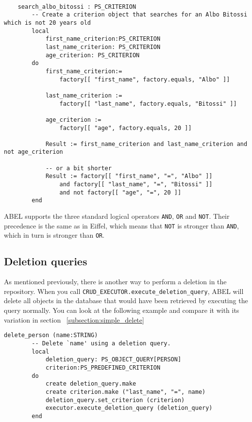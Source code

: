 \begin{lstlisting}[language=OOSC2Eiffel, captionpos=b, caption={}, label={lst:search_albo_bitossi}]

	search_albo_bitossi : PS_CRITERION
		-- Create a criterion object that searches for an Albo Bitossi which is not 20 years old
		local
			first_name_criterion:PS_CRITERION
			last_name_criterion: PS_CRITERION
			age_criterion: PS_CRITERION
		do
			first_name_criterion:= 
				factory[[ "first_name", factory.equals, "Albo" ]]

			last_name_criterion := 
				factory[[ "last_name", factory.equals, "Bitossi" ]]

			age_criterion := 
				factory[[ "age", factory.equals, 20 ]]
			
			Result := first_name_criterion and last_name_criterion and not age_criterion

			-- or a bit shorter
			Result := factory[[ "first_name", "=", "Albo" ]] 
				and factory[[ "last_name", "=", "Bitossi" ]] 
				and not factory[[ "age", "=", 20 ]]
		end
\end{lstlisting}

ABEL supports the three standard logical operators \lstinline!AND!, \lstinline!OR! and \lstinline!NOT!. 
Their precedence is the same as in Eiffel, which means that \lstinline!NOT! is stronger than \lstinline!AND!, which in turn is stronger than \lstinline!OR!.


\subsection{Deletion queries}
\label{subsection:deletion_query}


As mentioned previously, there is another way to perform a deletion in the repository.
When you call \lstinline!CRUD_EXECUTOR.execute_deletion_query!, ABEL will delete all objects in the database that would have been retrieved by executing the query normally.
You can look at the following example and compare it with its variation in section ~\ref{subsection:simple_delete}

\begin{lstlisting}[language=OOSC2Eiffel, captionpos=b, caption={}, label={lst:deletion_query}]
	delete_person (name:STRING)
		-- Delete `name' using a deletion query.
		local
			deletion_query: PS_OBJECT_QUERY[PERSON]
			criterion:PS_PREDEFINED_CRITERION
		do
			create deletion_query.make
			create criterion.make ("last_name", "=", name)
			deletion_query.set_criterion (criterion)
			executor.execute_deletion_query (deletion_query)
		end
\end{lstlisting}

